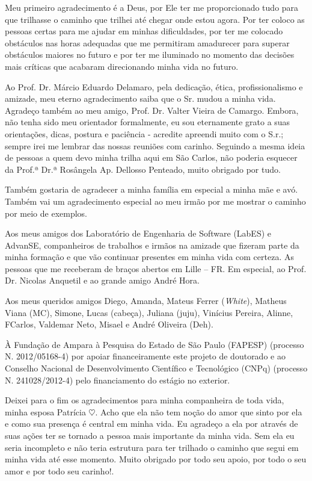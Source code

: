 Meu primeiro agradecimento é a Deus, por Ele ter me proporcionado tudo para que trilhasse o caminho que trilhei até chegar onde estou agora. Por ter coloco as pessoas certas para me ajudar em minhas dificuldades, por ter me colocado obstáculos nas horas adequadas que me permitiram amadurecer para superar obstáculos maiores no futuro e por ter me iluminado no momento das decisões mais críticas que acabaram direcionando minha vida no futuro.

Ao Prof. Dr. Márcio Eduardo Delamaro, pela dedicação, ética, profissionalismo e amizade, meu eterno agradecimento saiba que o Sr. mudou a minha vida. Agradeço também ao meu amigo, Prof. Dr. Valter Vieira de Camargo. Embora, não tenha sido meu orientador formalmente, eu sou eternamente grato a suas orientações, dicas, postura e paciência - acredite apreendi muito com o S.r.; sempre irei me lembrar das nossas reuniões com carinho. Seguindo a mesma ideia de pessoas a quem devo minha trilha aqui em São Carlos, não poderia esquecer da Prof.ª Dr.ª Rosângela Ap. Dellosso Penteado, muito obrigado por tudo.

Também gostaria de agradecer a minha família em especial a minha mãe e avó. Também vai um agradecimento especial ao meu irmão por me mostrar o caminho por meio de exemplos.

Aos meus amigos dos Laboratório de Engenharia de Software (LabES) e AdvanSE, companheiros de trabalhos e irmãos na amizade que fizeram parte da minha formação e que vão continuar presentes em minha vida com certeza. As pessoas que me receberam de braços abertos em Lille – FR. Em especial, ao Prof. Dr. Nicolas Anquetil e ao grande amigo André Hora. 

Aos meus queridos amigos Diego, Amanda, Mateus Ferrer (\textit{White}), Matheus Viana (MC), Simone, Lucas (cabeça), Juliana (juju), Vinícius Pereira, Alinne, FCarlos, Valdemar Neto, Misael e André Oliveira (Deh).

À Fundação de Ampara à Pesquisa do Estado de São Paulo (FAPESP) (processo N. 2012/05168-4) por apoiar financeiramente este projeto de doutorado e ao Conselho Nacional de Desenvolvimento Científico e Tecnológico (CNPq) (processo N. 241028/2012-4) pelo financiamento do estágio no exterior.

Deixei para o fim os agradecimentos para minha companheira de toda vida, minha esposa Patrícia $\heartsuit$. Acho que ela não tem noção do amor que sinto por ela e como sua presença é central em minha vida. Eu agradeço a ela por através de suas ações ter se tornado a pessoa mais importante da minha vida. Sem ela eu seria incompleto e não teria estrutura para ter trilhado o caminho que segui em minha vida até esse momento. Muito obrigado por todo seu apoio, por todo o seu amor e por todo seu carinho!.

